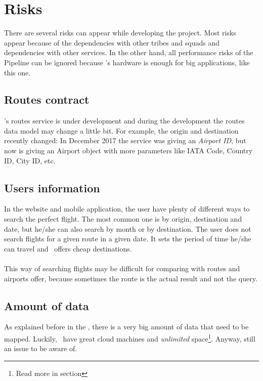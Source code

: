 
\section{Risks}

There are several risks can appear while developing the project. Most risks appear because of the dependencies with other tribes and squads and dependencies with other services. In the other hand, all performance risks of the Pipeline can be ignored because \company's hardware is enough for big applications, like this one.

\subsection{Routes contract}

\squad's routes service is under development and during the \thesistitle development the routes data model may change a little bit. For example, the origin and destination recently changed: In December 2017 the service was giving an \textit{Airport ID}, but now is giving an Airport object with more parameters like IATA Code\cite{iata_code}, Country ID, City ID, etc.

\subsection{Users information}

In the website and mobile application, the user have plenty of different ways to search the perfect flight. The most common one is by origin, destination and date, but he/she can also search by month or by destination. The user does not search flights for a given route in a given date. It sets the period of time he/she can travel and \company\ offers cheap destinations.
\\\\
This way of searching flights may be difficult for comparing with routes and airports offer, because sometimes the route is the actual result and not the query.

\subsection{Amount of data}

As explained before in the , there is a very big amount of data that need to be mapped. Luckily, \company\ have great cloud machines and \textit{unlimited} space\footnote{Read more in section }. Anyway, still an issue to be aware of.

